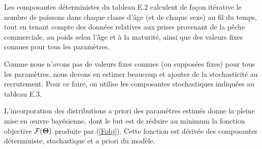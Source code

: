 \documentclass[11pt]{book}
\newcommand{\Fobj}{\mathcal{F}}%
\def\bfTh{{\bf \Theta}}%
\def\AppLet{E}                   %
\def\bfTh{{\bf \Theta}}          %
\newcommand{\eref}[1]{(\ref{#1})}
\begin{document}
Les composantes d\'{e}terministes du tableau \AppLet.2 calculent de fa\c{c}on it\'{e}rative le nombre de poissons dans chaque classe d'\^{a}ge (et de chaque sexe) au fil du temps, tout en tenant compte des donn\'{e}es relatives aux prises provenant de la p\^{e}che commerciale, au poids selon l'\^{a}ge et \`{a} la maturit\'{e}, ainsi que des valeurs fixes connues pour tous les param\`{e}tres.

Comme nous n'avons pas de valeurs fixes connues (ou suppos\'{e}es fixes) pour tous les param\`{e}tres, nous devons en estimer beaucoup et ajouter de la stochasticit\'{e} au recrutement.
Pour ce faire, on utilise les composantes stochastiques indiqu\'{e}es au tableau \AppLet.3.

L'incorporation des distributions a priori des param\`{e}tres estim\'{e}s donne la pleine mise en {\oe}uvre bay\'{e}sienne, dont le but est de r\'{e}duire au minimum la fonction objective $\Fobj(\bfTh)$ produite par \eref{Fobj}.
Cette fonction est d\'{e}riv\'{e}e des composantes d\'{e}terministe, stochastique et a priori du mod\`{e}le. %

\smallskip


\setlength\tabcolsep{0pt}

\end{document}
